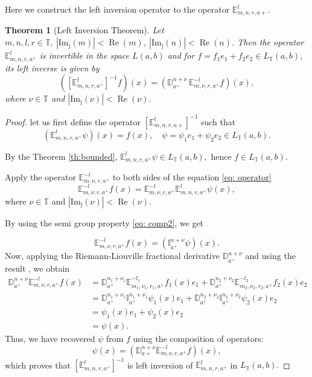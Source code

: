 \documentclass[a4paper,12pt]{article}
\newtheorem{theorem}{Theorem}[section]
\theoremstyle{remark}
\begin{document}
\noindent Here we construct the left inversion operator to the  operator $\mathbb{E}^{l}_{m,n,r,a+}.$
\begin{theorem}[Left Inversion Theorem]
	Let $ m,n,l,r\in\mathbb{T}, ~|\operatorname{Im_j}(m )|<\operatorname{Re}(m),~|\operatorname{Im_j}(n) |<\operatorname{Re}(n)$. Then the operator $\mathbb{E}^{l}_{m,n,r,a^+}$ is invertible in the space $L(a, b)$ and for $f =f_1e_1+f_2e_2\in L_{\mathbb{T}}(a, b)$, its left inverse is given by
	\[
	\left( \left[ \mathbb{E}^{l}_{m,n,r,a^+} \right]^{-1} f \right)(x) = \left( \mathbb{D}^{n+\nu}_{a^+} \, \mathbb{E}^{-l}_{m,\nu,r,a^+} f \right)(x),
	\]
	where $\nu \in \mathbb{T}$ and $|\operatorname{Im_j}(\nu) |<\operatorname{Re}(\nu)$.
\end{theorem}
\begin{proof}
	let us first define the operator $\left[ \mathbb{E}^{l}_{m,n,r,a+} \right]^{-1}$ such that 
	\begin{equation}\label{eq: operator}	
	\left( \mathbb{E}^{l}_{m,n,r,a^+} \psi \right)(x) = f(x), \quad\psi =\psi_1e_1+\psi_2e_2\in L_{\mathbb{T}}(a,b).
	\end{equation}

	By the Theorem \ref{th:bounded}, $\mathbb{E}^{l}_{m,n,r,a^+}\psi \in L_{\mathbb{T}}(a, b),$ hence $f \in L_{\mathbb{T}}(a, b)$.
	

	 Apply the operator $\mathbb{E}^{-l}_{m,\nu,r,a^+}$ to both sides of the equation \eqref{eq: operator}
	\[
	\mathbb{E}^{-l}_{m,\nu,r,a^+} f(x) = \mathbb{E}^{-l}_{m,\nu,r,a^+} \mathbb{E}^{l}_{m,n,r,a^+} \psi(x),
	\]
	where  $\nu \in \mathbb{T}$ and $|\operatorname{Im_j}(\nu) |<\operatorname{Re}(\nu)$.
	
	By using the semi group property  \eqref{eq: comp2}, we get
	

	\[ 	\mathbb{E}^{-l}_{m,\nu,r,a^+} f(x) = \left( \mathbb{I}^{n+\nu}_{a^+} \psi \right)(x).
	\]
	Now, applying the Riemann-Liouville fractional derivative $\mathbb{D}^{n+\nu}_{a^+}$   and using the  result \cite[Lemma 3, equation (3.9)]{kilbas2004generalized}, we obtain
    \begin{equation}
\begin{split}
	\mathbb{D}^{n+\nu}_{a^+} \mathbb{E}^{-l}_{m,\nu,r,a^+} f(x)&=
		\mathbb{D}^{n_1+\nu_1}_{a^+} \mathbb{E}^{-l_1}_{m_1,\nu_1,r_1,a^+} f_1(x) e_1+	\mathbb{D}^{n_2+\nu_2}_{a^+} \mathbb{E}^{-l_2}_{m_2,\nu_2,r_2,a^+} f_2(x)e_2\\
		&=\mathbb{D}^{n_1+\nu_1}_{a^+} \mathbb{I}^{n_1+\nu_1}_{a^+} \psi_1 (x) e_1+	\mathbb{D}^{n_2+\nu_2}_{a^+}  \mathbb{I}^{n_2+\nu_2}_{a^+} \psi_2 (x)e_2\\
		&=\psi_1(x)e_1+\psi_2(x)e_2\\
        &=\psi(x).
\end{split}
\end{equation}
	Thus, we have recovered $\psi$ from $f$ using the composition of operators:
	\[
	\psi(x) = \left( \mathbb{D}^{n+\nu}_{a+} \mathbb{E}^{-l}_{m,\nu,r,a^+} f \right)(x),
	\]
	which proves that $\left[ \mathbb{E}^{l}_{m,n,r,a^+}\right]^{-1} $ is left inversion of $\mathbb{E}^{l}_{m,n,r,a^+}$ in $L_{\mathbb{T}}(a,b).$ 
\end{proof}
\end{document}
